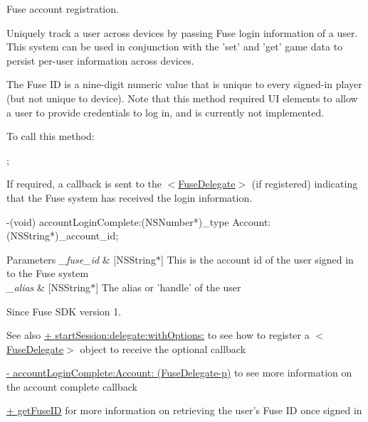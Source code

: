 Fuse account registration. 

Uniquely track a user across devices by passing Fuse login information of a user. This system can be used in conjunction with the 'set' and 'get' game data to persist per-\/user information across devices.

The Fuse I\+D is a nine-\/digit numeric value that is unique to every signed-\/in player (but not unique to device). Note that this method required U\+I elements to allow a user to provide credentials to log in, and is currently not implemented.

To call this method\+:


\begin{DoxyCode}
;
\end{DoxyCode}


If required, a callback is sent to the $<$\hyperlink{protocol_fuse_delegate-p}{Fuse\+Delegate}$>$ (if registered) indicating that the Fuse system has received the login information.


\begin{DoxyCode}
-(void) accountLoginComplete:(NSNumber*)\_type Account:(NSString*)\_account\_id;
\end{DoxyCode}



\begin{DoxyParams}{Parameters}
{\em \+\_\+fuse\+\_\+id} & \mbox{[}N\+S\+String$\ast$\mbox{]} This is the account id of the user signed in to the Fuse system \\
\hline
{\em \+\_\+alias} & \mbox{[}N\+S\+String$\ast$\mbox{]} The alias or 'handle' of the user \\
\hline
\end{DoxyParams}
\begin{DoxySince}{Since}
Fuse S\+D\+K version 1. 
\end{DoxySince}
\begin{DoxySeeAlso}{See also}
\hyperlink{interface_fuse_s_d_k_adf7ed64a02b9540c9ded4b931ea4e400}{+ start\+Session\+:delegate\+:with\+Options\+:} to see how to register a $<$\hyperlink{protocol_fuse_delegate-p}{Fuse\+Delegate}$>$ object to receive the optional callback 

\hyperlink{protocol_fuse_delegate-p_a54a18530604a7ceeb0e9419fc7fa3345}{-\/ account\+Login\+Complete\+:\+Account\+: (\+Fuse\+Delegate-\/p)} to see more information on the account complete callback 

\hyperlink{interface_fuse_s_d_k_ab483c2a3f4439aad8e19200cf24ff731}{+ get\+Fuse\+I\+D} for more information on retrieving the user's Fuse I\+D once signed in 
\end{DoxySeeAlso}
\hypertarget{interface_fuse_s_d_k_a02a3bc5562d4f6e50bac5339f4ac4046}{}
